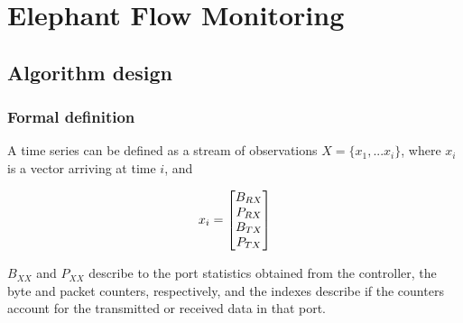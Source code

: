 \chapter{Elephant Flow Monitoring} \label{chap:me} %

\section {Algorithm design}
\subsection {Formal definition}

A time series can be defined as a stream of observations $X = \{x_1, ... x_i\}$, where $x_i$ is a vector arriving at time $i$, and

\begin {equation}
\centering
x_i = 
\begin{bmatrix}
B_{RX}\\
P_{RX}\\
B_{TX}\\
P_{TX}\\
\end{bmatrix}
\end {equation}

\par $B_{XX}$ and $P_{XX}$ describe to the port statistics obtained from the controller, the byte and packet counters, respectively, and the indexes describe if the counters account for the transmitted or received data in that port.

